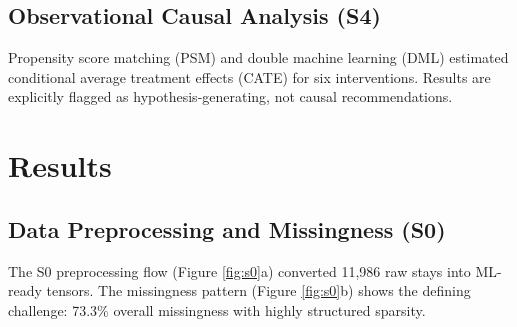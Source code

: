 \documentclass[11pt,a4paper]{article}
\begin{document}
\subsection{Observational Causal Analysis (S4)}

Propensity score matching (PSM) and double machine learning (DML) estimated conditional average treatment effects (CATE) for six interventions. Results are explicitly flagged as hypothesis-generating, not causal recommendations.

\FloatBarrier

\section{Results}

\subsection{Data Preprocessing and Missingness (S0)}

The S0 preprocessing flow (Figure \ref{fig:s0}a) converted 11,986 raw stays into ML-ready tensors. The missingness pattern (Figure \ref{fig:s0}b) shows the defining challenge: 73.3\% overall missingness with highly structured sparsity.
\end{document}
